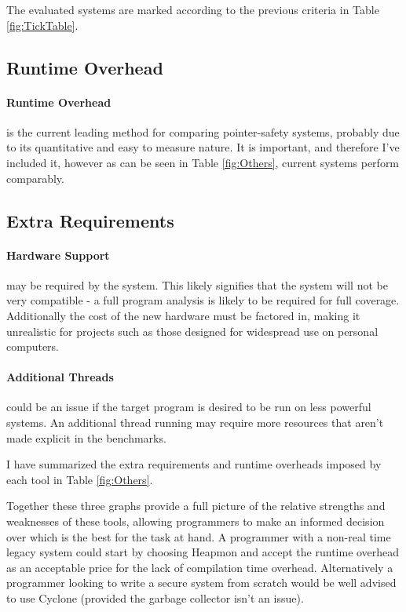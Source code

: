 The evaluated systems are marked according to the previous criteria in Table \ref{fig:TickTable}.

\subsection{Runtime Overhead}

\paragraph{Runtime Overhead} is the current leading method for comparing pointer-safety systems, probably due to its quantitative and easy to measure nature.
It is important, and therefore I've included it, however as can be seen in Table \ref{fig:Others}, current systems perform comparably.

\subsection{Extra Requirements}

\paragraph{Hardware Support} may be required by the system.
This likely signifies that the system will not be very compatible - a full program analysis is likely to be required for full coverage.
Additionally the cost of the new hardware must be factored in, making it unrealistic for projects such as those designed for widespread use on personal computers.

\paragraph{Additional Threads} could be an issue if the target program is desired to be run on less powerful systems.
An additional thread running may require more resources that aren't made explicit in the benchmarks.

I have summarized the extra requirements and runtime overheads imposed by each tool in Table \ref{fig:Others}.

Together these three graphs provide a full picture of the relative strengths and weaknesses of these tools, allowing programmers to make an informed decision over which is the best for the task at hand.
A programmer with a non-real time legacy system could start by choosing Heapmon and accept the runtime overhead as an acceptable price for the lack of compilation time overhead.
Alternatively a programmer looking to write a secure system from scratch would be well advised to use Cyclone (provided the garbage collector isn't an issue).

